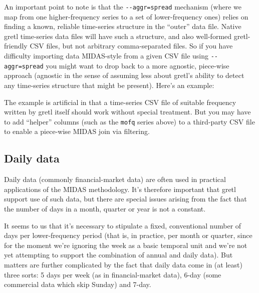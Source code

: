 An important point to note is that the \verb|--aggr=spread| mechanism
(where we map from one higher-frequency series to a set of
lower-frequency ones) relies on finding a known, reliable time-series
structure in the ``outer'' data file. Native gretl time-series data
files will have such a structure, and also well-formed gretl-friendly
CSV files, but not arbitrary comma-separated files.  So if you have
difficulty importing data MIDAS-style from a given CSV file using
\verb|--aggr=spread| you might want to drop back to a more agnostic,
piece-wise approach (agnostic in the sense of assuming less about
gretl's ability to detect any time-series structure that might be
present). Here's an example:
%

The example is artificial in that a time-series CSV file of suitable
frequency written by gretl itself should work without special
treatment. But you may have to add ``helper'' columns (such as the
\texttt{mofq} series above) to a third-party CSV file to enable a
piece-wise MIDAS join via filtering.


\subsection{Daily data}
\label{sec:midas-daily}

Daily data (commonly financial-market data) are often used in practical
applications of the MIDAS methodology. It's therefore important that
gretl support use of such data, but there are special issues arising
from the fact that the number of days in a month, quarter or year is
not a constant.

It seems to us that it's necessary to stipulate a fixed, conventional
number of days per lower-frequency period (that is, in practice, per
month or quarter, since for the moment we're ignoring the week as a
basic temporal unit and we're not yet attempting to support the
combination of annual and daily data). But matters are further
complicated by the fact that daily data come in (at least) three
sorts: 5 days per week (as in financial-market data), 6-day (some
commercial data which skip Sunday) and 7-day.

